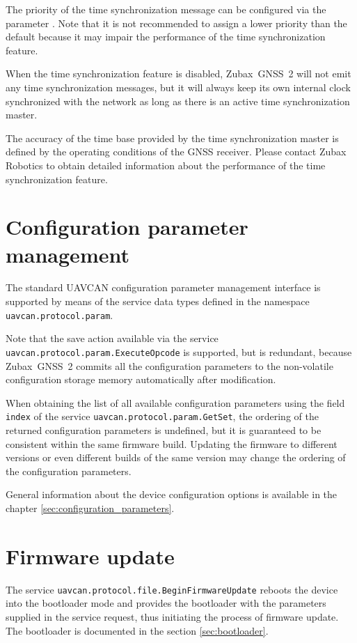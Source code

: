 \documentclass{zubaxdoc}
\begin{document}
The priority of the time synchronization message can be configured via the parameter
.
Note that it is not recommended to assign a lower priority than the default because it may impair
the performance of the time synchronization feature.

When the time synchronization feature is disabled,
Zubax~GNSS~2 will not emit any time synchronization messages,
but it will always keep its own internal clock synchronized with the network
as long as there is an active time synchronization master.

The accuracy of the time base provided by the time synchronization master is defined by the
operating conditions of the GNSS receiver.
Please contact Zubax Robotics to obtain detailed information about the performance of the
time synchronization feature.

\section{Configuration parameter management}

The standard UAVCAN configuration parameter management interface is supported
by means of the service data types defined in the namespace \verb|uavcan.protocol.param|.

Note that the save action available via the service \verb|uavcan.protocol.param.ExecuteOpcode|
is supported, but is redundant, because Zubax~GNSS~2 commits all the configuration parameters
to the non-volatile configuration storage memory automatically after modification.

When obtaining the list of all available configuration parameters using the field \verb|index|
of the service \verb|uavcan.protocol.param.GetSet|, the ordering of the returned configuration
parameters is undefined, but it is guaranteed to be consistent within the same firmware build.
Updating the firmware to different versions or even different builds of the same version
may change the ordering of the configuration parameters.

General information about the device configuration options is available in the chapter 
\ref{sec:configuration_parameters}.

\section{Firmware update}

The service \verb|uavcan.protocol.file.BeginFirmwareUpdate| reboots the device into the bootloader
mode and provides the bootloader with the parameters supplied in the service request,
thus initiating the process of firmware update.
The bootloader is documented in the section \ref{sec:bootloader}.
\end{document}

